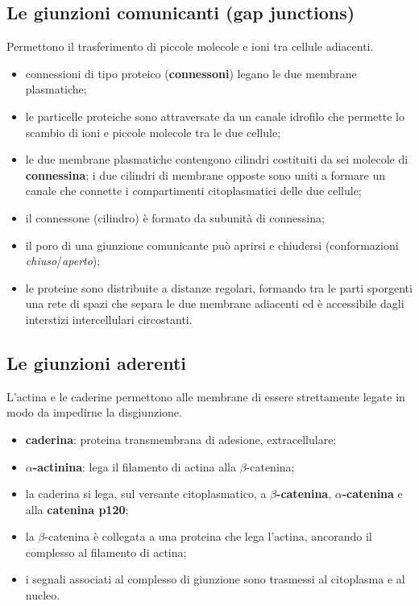 \subsection{Le giunzioni comunicanti (gap junctions)}

Permettono il trasferimento di piccole molecole e ioni tra cellule adiacenti.

\begin{itemize}
  \item connessioni di tipo proteico (\textbf{connessoni}) legano le due membrane plasmatiche;
  \item le particelle proteiche sono attraversate da un canale idrofilo che permette lo scambio di ioni e piccole molecole tra le due cellule;
  \item le due membrane plasmatiche contengono cilindri costituiti da sei molecole di \textbf{connessina}; i due cilindri di membrane opposte sono uniti a formare un canale che connette i compartimenti citoplasmatici delle due cellule;
  \item il connessone (cilindro) è formato da subunità di connessina;
  \item il poro di una giunzione comunicante può aprirsi e chiudersi (conformazioni \textit{chiuso}/\textit{aperto});
  \item le proteine sono distribuite a distanze regolari, formando tra le parti sporgenti una rete di spazi che separa le due membrane adiacenti ed è accessibile dagli interstizi intercellulari circostanti.
\end{itemize}

\subsection{Le giunzioni aderenti}

L'actina e le caderine permettono alle membrane di essere strettamente legate in modo da impedirne la disgiunzione.

\begin{itemize}
  \item \textbf{caderina}: proteina transmembrana di adesione, extracellulare;
  \item \textbf{$\alpha$-actinina}: lega il filamento di actina alla $\beta$-catenina;
  \item la caderina si lega, sul versante citoplasmatico, a \textbf{$\beta$-catenina}, \textbf{$\alpha$-catenina} e alla \textbf{catenina p120};
  \item la $\beta$-catenina è collegata a una proteina che lega l'actina, ancorando il complesso al filamento di actina;
  \item i segnali associati al complesso di giunzione sono trasmessi al citoplasma e al nucleo.
\end{itemize}

